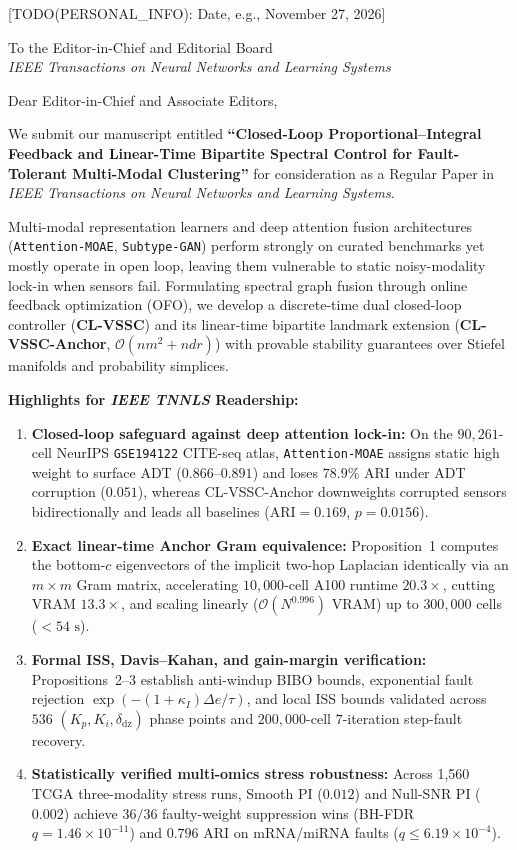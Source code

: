 \documentclass[11pt,letterpaper]{article}
\begin{document}
[TODO(PERSONAL\_INFO): Date, e.g., November 27, 2026]

\vspace{6pt}
To the Editor-in-Chief and Editorial Board\\
\textit{IEEE Transactions on Neural Networks and Learning Systems}

\vspace{6pt}
Dear Editor-in-Chief and Associate Editors,

We submit our manuscript entitled \textbf{``Closed-Loop Proportional--Integral Feedback and Linear-Time Bipartite Spectral Control for Fault-Tolerant Multi-Modal Clustering''} for consideration as a Regular Paper in \textit{IEEE Transactions on Neural Networks and Learning Systems}.

Multi-modal representation learners and deep attention fusion architectures (\texttt{Attention-MOAE}, \texttt{Subtype-GAN}) perform strongly on curated benchmarks yet mostly operate in open loop, leaving them vulnerable to static noisy-modality lock-in when sensors fail. Formulating spectral graph fusion through online feedback optimization (OFO), we develop a discrete-time dual closed-loop controller (\textbf{CL-VSSC}) and its linear-time bipartite landmark extension (\textbf{CL-VSSC-Anchor}, $\mathcal{O}(nm^2 + ndr)$) with provable stability guarantees over Stiefel manifolds and probability simplices.

\textbf{Highlights for \textit{IEEE TNNLS} Readership:}
\begin{enumerate}\setlength{\itemsep}{2pt}
    \item \textbf{Closed-loop safeguard against deep attention lock-in:} On the $90{,}261$-cell NeurIPS \texttt{GSE194122} CITE-seq atlas, \texttt{Attention-MOAE} assigns static high weight to surface ADT ($0.866\text{--}0.891$) and loses $78.9\%$ ARI under ADT corruption ($0.051$), whereas CL-VSSC-Anchor downweights corrupted sensors bidirectionally and leads all baselines ($\mathrm{ARI}=0.169$, $p=0.0156$).
    \item \textbf{Exact linear-time Anchor Gram equivalence:} Proposition~1 computes the bottom-$c$ eigenvectors of the implicit two-hop Laplacian identically via an $m \times m$ Gram matrix, accelerating $10{,}000$-cell A100 runtime $20.3\times$, cutting VRAM $13.3\times$, and scaling linearly ($\mathcal{O}(N^{0.996})$ VRAM) up to $300{,}000$ cells ($<54\text{ s}$).
    \item \textbf{Formal ISS, Davis--Kahan, and gain-margin verification:} Propositions~2--3 establish anti-windup BIBO bounds, exponential fault rejection $\exp(-(1+\kappa_I)\Delta e/\tau)$, and local ISS bounds validated across $536$ $(K_p,K_i,\delta_{\mathrm{dz}})$ phase points and $200{,}000$-cell $7$-iteration step-fault recovery.
    \item \textbf{Statistically verified multi-omics stress robustness:} Across 1,560 TCGA three-modality stress runs, Smooth PI ($0.012$) and Null-SNR PI ($0.002$) achieve $36/36$ faulty-weight suppression wins (BH-FDR $q=1.46 \times 10^{-11}$) and $0.796$ ARI on mRNA/miRNA faults ($q \le 6.19 \times 10^{-4}$).
\end{enumerate}
\end{document}
